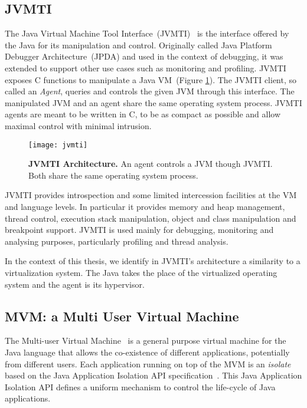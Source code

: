 \subsection*{JVMTI}
The Java Virtual Machine Tool Interface~(JVMTI)~\cite{JVMPI} is the interface offered by the Java \VM for its manipulation and control. Originally called Java Platform Debugger Architecture~(JPDA) and used in the context of debugging, it was extended to support other use cases such as monitoring and profiling.
JVMTI exposes C functions to manipulate a Java VM~(Figure \ref{fig:jvmti}). The JVMTI client, so called an \emph{Agent}, queries and controls the given JVM through this interface. The manipulated JVM and an agent share the same operating system process. JVMTI agents are meant to be written in C, to be as compact as possible and allow maximal control with minimal intrusion.

\begin{figure}[ht]
\begin{center}
\texttt{[image: jvmti]}
\caption{\textbf{JVMTI Architecture.} An agent controls a JVM though JVMTI. Both share the same operating system process.\label{fig:jvmti}}
\end{center}
\end{figure}

JVMTI provides introspection and some limited intercession facilities at the VM and language levels. In particular it provides memory and heap management, thread control, execution stack manipulation, object and class manipulation and breakpoint support. JVMTI is used mainly for debugging, monitoring and analysing purposes, particularly profiling and thread analysis.

In the context of this thesis, we identify in JVMTI's architecture a similarity to a virtualization system. The Java \VM takes the place of the virtualized operating system and the agent is its hypervisor.

\subsection*{MVM: a Multi User Virtual Machine}
The Multi-user Virtual Machine~\cite{Czaj03a,Czaj01a} is a general purpose virtual machine for the Java language that allows the co-existence of different applications, potentially from different users. Each application running on top of the MVM is an \emph{isolate} based on the Java Application Isolation API specification~\cite{JSR121}. This Java Application Isolation API defines a uniform mechanism to control the life-cycle of Java applications.


